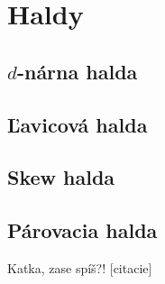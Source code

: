 \section{Haldy}
\subsection{$d$-nárna halda}
\subsection{Ľavicová halda}
\subsection{Skew halda}
\subsection{Párovacia halda}
Katka, zase spíš?!
[citacie]
